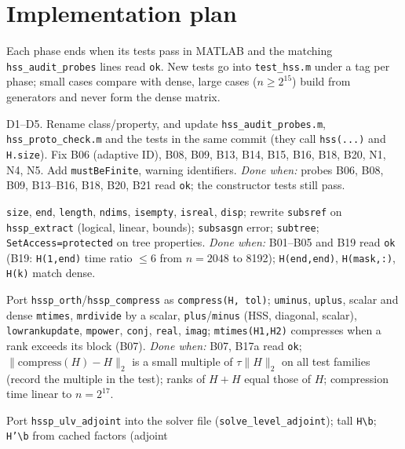 \documentclass[11pt]{article}
\newcommand{\code}[1]{\texttt{#1}}
\begin{document}
\section{Implementation plan}\label{sec:plan}
Each phase ends when its tests pass in MATLAB and the matching \code{hss\_audit\_probes} lines read \code{ok}.
New tests go into \code{test\_hss.m} under a tag per phase; small cases compare with dense, large cases
($n\ge2^{15}$) build from generators and never form the dense matrix.

\begin{description}[leftmargin=1.2em,style=nextline]
\item[Phase 0: decisions and safety (small).] D1--D5. Rename class/property, and update
\code{hss\_audit\_probes.m}, \code{hss\_proto\_check.m} and the tests in the same commit (they call \code{hss(...)}
and \code{H.size}). Fix B06 (adaptive ID), B08, B09, B13, B14, B15, B16, B18, B20, N1, N4, N5. Add
\code{mustBeFinite}, warning identifiers.
\emph{Done when:} probes B06, B08, B09, B13--B16, B18, B20, B21 read \code{ok}; the constructor tests still pass.
\item[Phase 1: MATLAB semantics (small--medium).] \code{size}, \code{end}, \code{length}, \code{ndims},
\code{isempty}, \code{isreal}, \code{disp}; rewrite \code{subsref} on \code{hssp\_extract} (logical, linear,
bounds); \code{subsasgn} error; \code{subtree}; \code{SetAccess=protected} on tree properties.
\emph{Done when:} B01--B05 and B19 read \code{ok} (B19: \code{H(1,end)} time ratio $\le6$ from $n=2048$ to 8192);
\code{H(end,end)}, \code{H(mask,:)}, \code{H(k)} match dense.
\item[Phase 2: arithmetic and compression (medium).] Port \code{hssp\_orth}/\code{hssp\_compress} as
\code{compress(H, tol)}; \code{uminus}, \code{uplus}, scalar and dense \code{mtimes}, \code{mrdivide} by a scalar,
\code{plus}/\code{minus} (HSS, diagonal, scalar), \code{lowrankupdate}, \code{mpower}, \code{conj},
\code{real}, \code{imag}; \code{mtimes(H1,H2)} compresses when a rank exceeds its block (B07).
\emph{Done when:} B07, B17a read \code{ok}; $\|\text{compress}(H)-H\|_2$ is a small multiple
of $\tau\|H\|_2$ on all test families (record the multiple in the test); ranks of $H+H$ equal those of $H$; compression time linear to $n=2^{17}$.
\item[Phase 3: solves and scalar quantities (medium).] Port \code{hssp\_ulv\_adjoint} into the solver file
(\code{solve\_level\_adjoint}); tall \code{H\textbackslash b}; \code{H'\textbackslash b} from cached factors (adjoint

\end{description}
\end{document}
